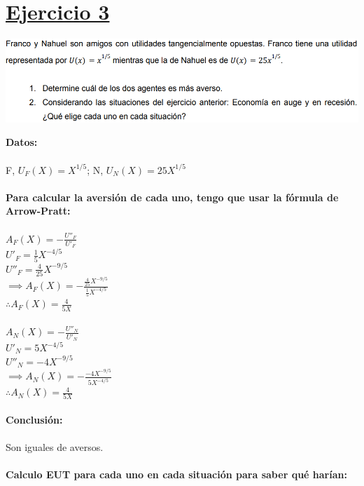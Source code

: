 \documentclass{article}
\begin{document}
    \section*{\underline{Ejercicio 3}}
      \begin{center}
        \includegraphics[width=0.8  \linewidth]{figs/adicionales-faciles-tres.png}
      \end{center}
      \textbf{Datos:}
      \\
      \\
      F, \(U_{F}(X) = X^{1/5}\); N, \(U_{N}(X) = 25X^{1/5}\)
      \\
      \\
      \textbf{Para calcular la aversión de cada uno, tengo que usar la fórmula de Arrow-Pratt:}
      \\
      \\
      \(A_{F}(X) = -\frac{U''_{F}}{U'_{F}}\)
      \\
      \(U'_{F} = \frac{1}{5}X^{-4/5}\)
      \\
      \(U''_{F} = \frac{4}{25}X^{-9/5}\)
      \\
      \(\implies A_{F}(X) = -\frac{\frac{4}{25}X^{-9/5}}{\frac{1}{5}X^{-4/5}}\)
      \\
      \(\therefore A_{F}(X) = \frac{4}{5X}\)
      \\
      \\
      \(A_{N}(X) = -\frac{U''_{N}}{U'_{N}}\)
      \\
      \(U'_{N} = 5X^{-4/5}\)
      \\
      \(U''_{N} = -4X^{-9/5}\)
      \\
      \(\implies A_{N}(X) = -\frac{-4X^{-9/5}}{5X^{-4/5}}\)
      \\
      \(\therefore A_{N}(X) = \frac{4}{5X}\)
      \\
      \\
      \textbf{Conclusión:}
      \\
      \\
      Son iguales de aversos.
      \\
      \\
      \textbf{Calculo EUT para cada uno en cada situación para saber qué harían:}
      \\
\end{document}
